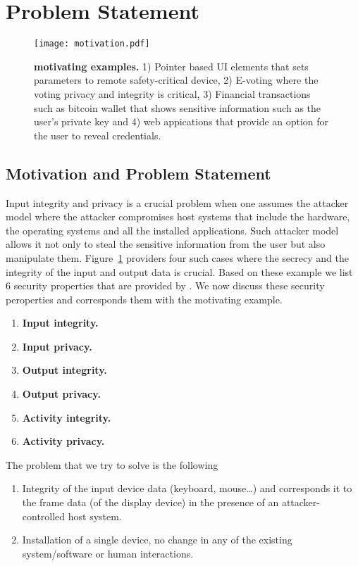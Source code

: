 \section{Problem Statement}
\label{sec:problemStatement}

\begin{figure}[t]
\centering
\texttt{[image: motivation.pdf]}
\caption{\textbf{\name motivating examples.} 1) Pointer based UI elements that sets parameters to remote safety-critical device, 2) E-voting where the voting privacy and integrity is critical, 3) Financial transactions such as bitcoin wallet that shows sensitive information such as the user's private key and 4) web appications that provide an option for the user to reveal credentials.}
\label{fig:motivation}
\centering
\end{figure}


\subsection{Motivation and Problem Statement}
Input integrity and privacy is a crucial problem when one assumes the attacker model where the attacker compromises host systems that include the hardware, the operating systems and all the installed applications. Such attacker model allows it not only to steal the sensitive information from the user but also manipulate them. Figure~\ref{fig:motivation} providers four such cases where the secrecy and the integrity of the input and output data is crucial. Based on these example we list 6 security properties that are provided by \name. We now discuss these security peroperties and corresponds them with the motivating example.

\begin{enumerate}
  \item \textbf{Input integrity.}
  \item \textbf{Input privacy.}
  \item \textbf{Output integrity.}
  \item \textbf{Output privacy.}
  \item \textbf{Activity integrity.}
  \item \textbf{Activity privacy.}
\end{enumerate}


The problem that we try to solve is the following

\begin{enumerate}
  \item Integrity of the input device data (keyboard, mouse\ldots) and corresponds it to the frame data (of the display device) in the presence of an attacker-controlled host system.
  \item Installation of a single device, no change in any of the existing system/software or human interactions.
\end{enumerate}

